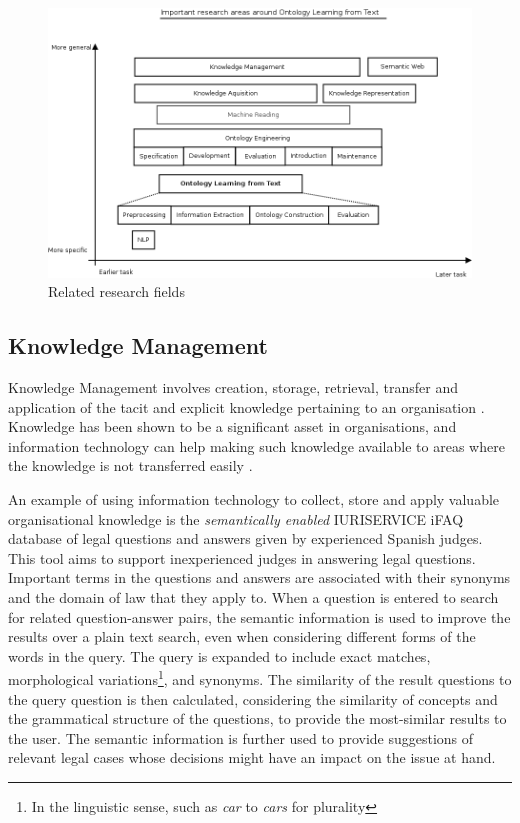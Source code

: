 \documentclass[a4paper]{report}
\begin{document}
\begin{figure}
  \includegraphics[width=\textwidth]{graphics/related-research-fields.png}
  \caption{Related research fields}
  \label{fig:related-research}
\end{figure}



\subsection{Knowledge Management}

Knowledge Management involves creation, storage, retrieval, transfer and application of the tacit and explicit knowledge pertaining to an organisation \citep{AlaviLeidner2001KM}.
Knowledge has been shown to be a significant asset in organisations, and information technology can help making such knowledge available to areas where the knowledge is not transferred easily \citep{AlaviLeidner2001KM}.

An example of using information technology to collect, store and apply valuable organisational knowledge is the \emph{semantically enabled} IURISERVICE iFAQ database of legal questions and answers given by experienced Spanish judges.
This tool aims to support inexperienced judges in answering legal questions\cite{IURISERVICEPerformance2007}.
Important terms in the questions and answers are associated with their synonyms and the domain of law that they apply to.
When a question is entered to search for related question-answer pairs, the semantic information is used to improve the results over a plain text search, even when considering different forms of the words in the query.
The query is expanded to include exact matches, morphological variations\footnote{In the linguistic sense, such as \emph{car} to \emph{cars} for plurality}, and synonyms.
The similarity of the result questions to the query question is then calculated, considering the similarity of concepts and the grammatical structure of the questions, to provide the most-similar results to the user.
The semantic information is further used to provide suggestions of relevant legal cases whose decisions might have an impact on the issue at hand.
\end{document}
